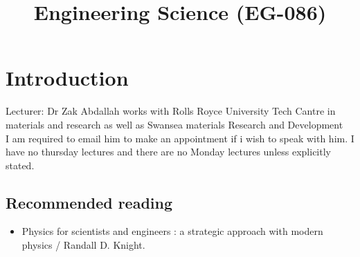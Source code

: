 \documentclass[a4paper, 12pt]{article}
\begin{document}
\title {Engineering Science (EG-086)}
\date{}
\maketitle

\tableofcontents

\newpage

\section{Introduction}
	Lecturer: Dr Zak Abdallah works with Rolls Royce University Tech Cantre in materials and research as well as Swansea materials Research and Development \\
	I am required to email him to make an appointment if i wish to speak with him. I have no thursday lectures and there are no Monday lectures unless explicitly stated.
	\subsection{Recommended reading}                                                                                                                                                                                                                                                                                                                                                                                                                                                                                                                                                                                                                                                                                                                                                                                                                                                                                                                                                                                                                                                                                                                                                                                                                                                                                                              
		\begin{itemize}
			\item Physics for scientists and engineers : a strategic approach with modern physics / Randall D. Knight.
		\end{itemize}
\end{document}
